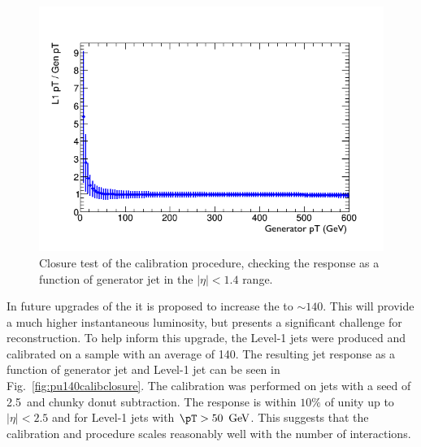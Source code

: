 \begin{figure}
	\begin{center}
		\includegraphics[width=0.8\linewidth]{figs/trigger/calibClosure_s5_donut}
  \caption{Closure test of the calibration procedure, checking the
  response as a function of generator jet \pT in the $|\eta|<1.4$ range.}
  \label{fig:calibclosure}
	\end{center}
\end{figure}

In future upgrades of the \LHC it is proposed to increase the \PU to
$\sim 140$. This will provide a much higher instantaneous luminosity,
but presents a significant challenge for reconstruction. To help
inform this upgrade, the Level-1 jets were produced and calibrated on a
sample with an average \PU of 140. The resulting jet response as a
function of generator jet \pT and Level-1 jet \eta can be seen in
Fig.~\ref{fig:pu140calibclosure}. The calibration was performed on
jets with a seed of 2.5~\gev and chunky donut subtraction. The
response is within $10\%$ of unity up to $|\eta|<2.5$ and for Level-1
jets with $\pT>50~\gev$. This suggests that the calibration and \PUS
procedure scales reasonably well with the number of \PU interactions.

